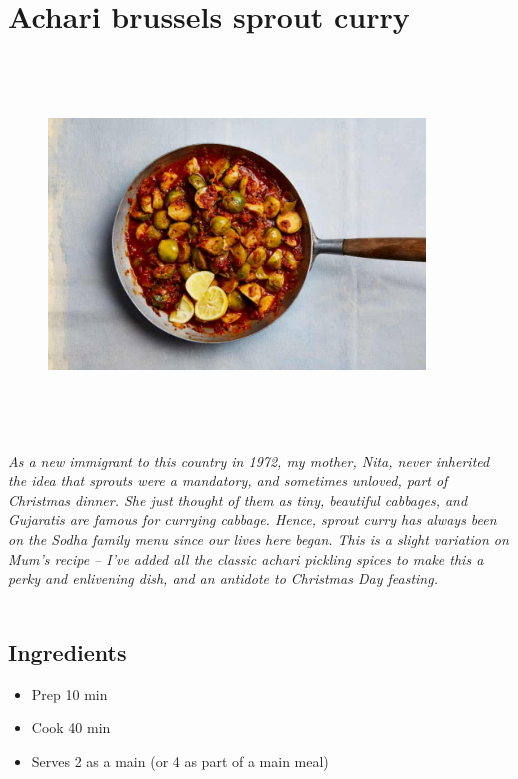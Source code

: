 \documentclass{book}
\begin{document}
\section{Achari brussels sprout curry}
\begin{figure}
\centering\includegraphics[width=10cm,height=10cm,keepaspectratio]{Recipe_Pictures/Achari_brussels_sprout_curry.png}
\end{figure}
\emph{As a new immigrant to this country in 1972, my mother, Nita, never inherited the idea that sprouts were a mandatory, and sometimes unloved, part of Christmas dinner. She just thought of them as tiny, beautiful cabbages, and Gujaratis are famous for currying cabbage. Hence, sprout curry has always been on the Sodha family menu since our lives here began. This is a slight variation on Mum’s recipe – I’ve added all the classic achari pickling spices to make this a perky and enlivening dish, and an antidote to Christmas Day feasting.}\\\\ 
\subsection*{Ingredients}
\begin{itemize}
\item Prep 10 min
\item Cook 40 min
\item Serves 2 as a main (or 4 as part of a main meal)
\end{itemize}
\end{document}
